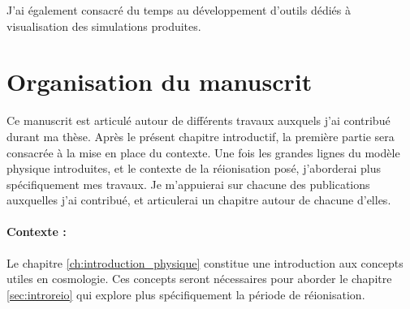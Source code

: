 J'ai également consacré du temps au développement d'outils dédiés à visualisation des simulations produites.

%

\section*{Organisation du manuscrit}

Ce manuscrit est articulé autour de différents travaux auxquels j'ai contribué durant ma thèse.
Après le présent chapitre introductif, la première partie sera consacrée à la mise en place du contexte.
Une fois les grandes lignes du modèle physique introduites, et le contexte de la réionisation posé, j'aborderai plus spécifiquement mes travaux.
Je m'appuierai sur chacune des publications auxquelles j'ai contribué, et articulerai un chapitre autour de chacune d'elles. 

\paragraph{Contexte :}
Le chapitre \ref{ch:introduction_physique} constitue une introduction aux concepts utiles en cosmologie.
Ces concepts seront nécessaires pour aborder le chapitre \ref{sec:introreio} qui explore plus spécifiquement la période de réionisation.


